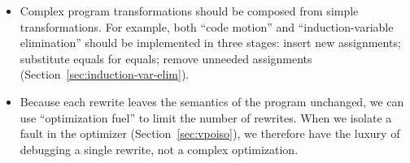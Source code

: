 \documentclass[blockstyle,preprint,natbib,nocopyrightspace]{sigplanconf}
\newcommand\secref[1]{Section~\ref{sec:#1}}
\begin{document}
\begin{itemize}
\item
Complex program transformations should be composed from simple
transformations. 
For example, both ``code motion'' and ``induction-variable
elimination'' should be implemented in three stages: insert new assignments;
substitute equals for equals; remove unneeded assignments
(\secref{induction-var-elim}). 

\item 
Because each rewrite leaves the semantics
of the program unchanged, 
we can use 
``optimization fuel'' to limit the number of rewrites.
 When we isolate a fault in the optimizer
(\secref{vpoiso}), we therefore have the luxury of debugging a single
 rewrite, not a complex optimization.
\end{itemize}
\end{document}
